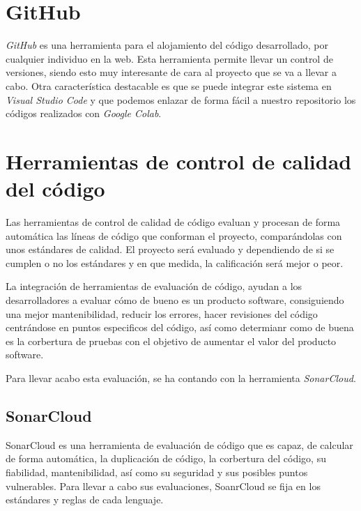 \section{GitHub}
\textit{GitHub} \cite{github} es una herramienta para el alojamiento del código desarrollado, por cualquier individuo en la web. Esta herramienta permite llevar un control de versiones, siendo esto muy interesante de cara al proyecto que se va a llevar a cabo.
Otra característica destacable es que se puede integrar este sistema en \textit{Visual Studio Code} \cite{visualStudioCode} y que podemos enlazar de forma fácil a nuestro repositorio los códigos realizados con \textit{Google Colab}\cite{colab}.

\section{Herramientas de control de calidad del código} \label{calidad_codigo}
Las herramientas de control de calidad de código evaluan y procesan de forma automática las líneas de código que conforman el proyecto, comparándolas con unos estándares de calidad. El proyecto será evaluado y dependiendo de si se cumplen o no los estándares y en que medida, la calificación será mejor o peor.

La integración de herramientas de evaluación de código, ayudan a los desarrolladores a evaluar cómo de bueno es un producto software, consiguiendo una mejor mantenibilidad, reducir los errores, hacer revisiones del código centrándose en puntos especificos del código, así como determianr como de buena es la corbertura de pruebas con el objetivo de aumentar el valor del producto software.

Para llevar acabo esta evaluación, se ha contando con la herramienta \textit{SonarCloud}. 

\subsection*{SonarCloud}

SonarCloud \cite{sonar_cloud} es una herramienta de evaluación de código que es capaz, de calcular de forma automática, la duplicación de código, la corbertura del código, su fiabilidad, mantenibilidad, así como su seguridad y sus posibles puntos vulnerables.
Para llevar a cabo sus evaluaciones, SoanrCloud se fija en los estándares y reglas de cada lenguaje.

